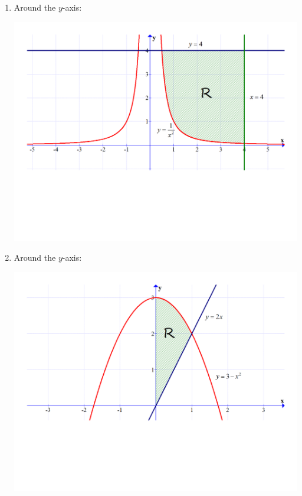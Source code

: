 \documentclass[12pt]{article}
\newif\ifans
\begin{document}
\begin{enumerate}
\begin{enumerate}
\begin{center}
\end{center}

\ifans{\fbox{$\pi\int_0^1 \left((3-x^2)^2-(2x)^2\right)\,dx$}} \fi

\item Around the $y$-axis:

\begin{center}

\includegraphics[scale=0.4]{graph3.pdf}

\end{center}

\ifans{\fbox{$\pi\int_{\frac{1}{16}}^4 \left(16-\frac{1}{y}\right) \,dy$}} \fi

\item Around the $y$-axis:

\begin{center}

\includegraphics[scale=0.4]{graph2.pdf}

\end{center}

\ifans{\fbox{$\pi\int_0^2 \left(\frac{y}{2}\right)^2 \,dy+\pi\int_2^3 (3-y) \,dy$}} \fi

\end{enumerate}

\end{enumerate}
\end{document}
